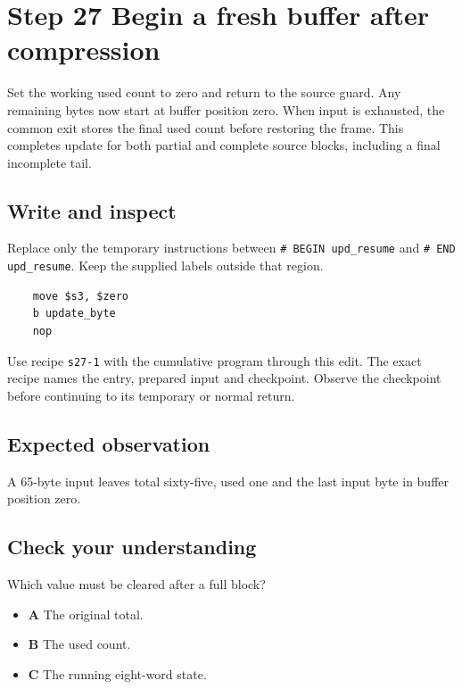 \section{Step 27 Begin a fresh buffer after compression}\label{sha-s27}

Set the working used count to zero and return to the source guard. Any remaining bytes now start at buffer position zero. When input is exhausted, the common exit stores the final used count before restoring the frame. This completes update for both partial and complete source blocks, including a final incomplete tail.

\subsection{Write and inspect}
Replace only the temporary instructions between \texttt{\# BEGIN upd\_resume} and \texttt{\# END upd\_resume}. Keep the supplied labels outside that region.

\begin{verbatim}
    move $s3, $zero
    b update_byte
    nop
\end{verbatim}

Use recipe \texttt{s27-1} with the cumulative program through this edit. The exact recipe names the entry, prepared input and checkpoint. Observe the checkpoint before continuing to its temporary or normal return.

\subsection{Expected observation}
A 65-byte input leaves total sixty-five, used one and the last input byte in buffer position zero.

\subsection{Check your understanding}
Which value must be cleared after a full block?

\begin{itemize}
\item \textbf{A} The original total.
\item \textbf{B} The used count.
\item \textbf{C} The running eight-word state.
\end{itemize}
